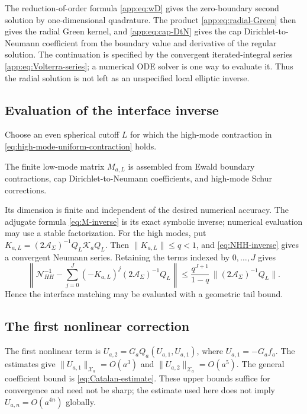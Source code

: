 \documentclass[11pt,a4paper,twoside]{article}
\numberwithin{equation}{section}
\theoremstyle{definition}
\theoremstyle{remark}
\begin{document}
The reduction-of-order formula \eqref{app:eq:wD} gives the
zero-boundary second solution by one-dimensional quadrature.
The product \eqref{app:eq:radial-Green} then gives the radial
Green kernel, and \eqref{app:eq:cap-DtN} gives the cap
Dirichlet-to-Neumann coefficient from the boundary value and
derivative of the regular solution.
The continuation is specified by the convergent iterated-integral
series \eqref{app:eq:Volterra-series}; a numerical ODE solver is one
way to evaluate it. Thus the radial solution is not left as an
unspecified local elliptic inverse.

\subsection{Evaluation of the interface inverse}
\label{subsec:evaluate-interface}

Choose an even spherical cutoff \(L\) for which the high-mode
contraction in
\eqref{eq:high-mode-uniform-contraction}
holds.

The finite low-mode matrix \(M_{a,L}\) is assembled from Ewald boundary contractions, cap
Dirichlet-to-Neumann coefficients, and high-mode Schur corrections.

Its dimension is finite and independent of the desired numerical
accuracy. The adjugate formula \eqref{eq:M-inverse} is its exact
symbolic inverse; numerical evaluation may use a stable factorization.
For the high modes, put
\(K_{a,L}=(2\mathcal A_\Sigma)^{-1}Q_L\mathcal K_aQ_L\).
Then \(\|K_{a,L}\|\le q<1\), and \eqref{eq:NHH-inverse}
gives a convergent Neumann series.
Retaining the terms indexed by \(0,\ldots,J\) gives
\[
\left\|
\mathcal N_{HH}^{-1}
-
\sum_{j=0}^{J}
(-K_{a,L})^j
(2\mathcal A_\Sigma)^{-1}Q_L
\right\|
\le
\frac{
q^{J+1}
}{
1-q
}
\,
\|(2\mathcal A_\Sigma)^{-1}Q_L\|.
\]
Hence the interface matching may be evaluated with a geometric tail
bound.

\subsection{The first nonlinear correction}
\label{subsec:first-nonlinear-correction}
The first nonlinear term is
\(U_{a,2}=G_aQ_a(U_{a,1},U_{a,1})\), where
\(U_{a,1}=-G_af_a\). The estimates give
\(\|U_{a,1}\|_{\mathcal X_a}=O(a^3)\) and
\(\|U_{a,2}\|_{\mathcal X_a}=O(a^5)\).
The general coefficient bound is \eqref{eq:Catalan-estimate}.
These upper bounds suffice for convergence and need not be sharp;
the estimate used here does not imply
\(U_{a,n}=O(a^{4n})\) globally.
\end{document}
